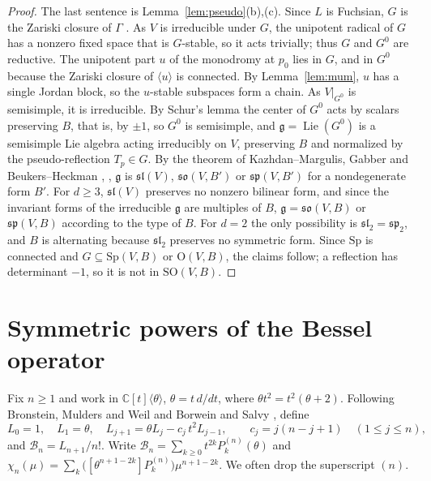 \documentclass[11pt]{amsart}
\theoremstyle{definition}
\newcommand{\C}{\mathbb C}
\newcommand{\cB}{\mathcal B}
\newcommand{\Sp}{\mathrm{Sp}}
\newcommand{\SO}{\mathrm{SO}}
\newcommand{\Ort}{\mathrm{O}}
\newcommand{\Lie}{\operatorname{Lie}}
\begin{document}
\begin{proof}
The last sentence is Lemma~\ref{lem:pseudo}(b),(c). Since $L$ is Fuchsian, $G$ is the Zariski closure of $\Gamma$ \cite[Thm.~5.8]{vdPS03}. As $V$ is irreducible under $G$, the unipotent radical of $G$ has a nonzero fixed space that is $G$-stable, so it acts trivially; thus $G$ and $G^0$ are reductive. The unipotent part $u$ of the monodromy at $p_0$ lies in $G$, and in $G^0$ because the Zariski closure of $\langle u\rangle$ is connected. By Lemma~\ref{lem:mum}, $u$ has a single Jordan block, so the $u$-stable subspaces form a chain. As $V|_{G^0}$ is semisimple, it is irreducible. By Schur's lemma the center of $G^0$ acts by scalars preserving $B$, that is, by $\pm1$, so $G^0$ is semisimple, and $\mathfrak g=\Lie(G^0)$ is a semisimple Lie algebra acting irreducibly on $V$, preserving $B$ and normalized by the pseudo-reflection $T_p\in G$. By the theorem of Kazhdan--Margulis, Gabber and Beukers--Heckman \cite[Thm.~1.5]{Kat90}, \cite{BH89}, $\mathfrak g$ is $\mathfrak{sl}(V)$, $\mathfrak{so}(V,B')$ or $\mathfrak{sp}(V,B')$ for a nondegenerate form $B'$. For $d\ge3$, $\mathfrak{sl}(V)$ preserves no nonzero bilinear form, and since the invariant forms of the irreducible $\mathfrak g$ are multiples of $B$, $\mathfrak g=\mathfrak{so}(V,B)$ or $\mathfrak{sp}(V,B)$ according to the type of $B$. For $d=2$ the only possibility is $\mathfrak{sl}_2=\mathfrak{sp}_2$, and $B$ is alternating because $\mathfrak{sl}_2$ preserves no symmetric form. Since $\Sp$ is connected and $G\subseteq\Sp(V,B)$ or $\Ort(V,B)$, the claims follow; a reflection has determinant $-1$, so it is not in $\SO(V,B)$.
\end{proof}
\section{Symmetric powers of the Bessel operator}\label{sec:bessel}

Fix $n\ge1$ and work in $\C[t]\langle\theta\rangle$, $\theta=t\,d/dt$, where $\theta t^2=t^2(\theta+2)$. Following Bronstein, Mulders and Weil \cite{BMW97} and Borwein and Salvy \cite{BS08}, define
\begin{equation}\label{eq:cont}
L_0=1,\quad L_1=\theta,\quad L_{j+1}=\theta L_j-c_j\,t^2L_{j-1},\qquad c_j=j(n-j+1)\quad(1\le j\le n),
\end{equation}
and $\cB_n=L_{n+1}/n!$. Write $\cB_n=\sum_{k\ge0}t^{2k}P^{(n)}_k(\theta)$ and $\chi_n(\mu)=\sum_k\bigl([\theta^{n+1-2k}]P^{(n)}_k\bigr)\mu^{n+1-2k}$. We often drop the superscript $(n)$.
\end{document}
